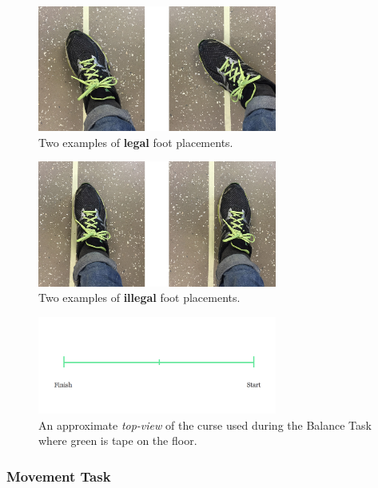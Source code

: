 \documentclass[runningheads,a4paper,oribibl]{llncs}
\begin{document}
\begin{figure}
   \centering
   \includegraphics[width=0.7\textwidth]{ExternalMaterial/Legal}
   \caption{Two examples of \textbf{legal} foot placements.} \label{fig:Legal}
\end{figure}

\begin{figure}
   \centering
   \includegraphics[width=0.7\textwidth]{ExternalMaterial/Illegal}
   \caption{Two examples of \textbf{illegal} foot placements.} \label{fig:Illegal}
\end{figure}

\begin{figure}
   \centering
   \includegraphics[width=0.7\textwidth]{ExternalMaterial/BalanceTask}
   \caption{An approximate \emph{top-view} of the curse used during the Balance Task where green is tape on the floor.} \label{fig:BalanceTask}
\end{figure}

\subsubsection{Movement Task}
\end{document}
